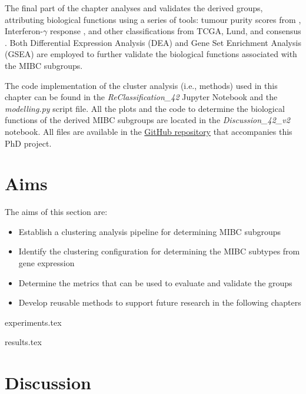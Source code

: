 The final part of the chapter analyses and validates the derived groups, attributing biological functions using a series of tools: tumour purity scores from \citet{Yoshihara2013-wq}, Interferon-$\gamma$ response \citet{Baker2022-bj}, and other classifications from TCGA, Lund, and consensus \citep{Robertson2017-mg,Marzouka2018-ge,Kamoun2020-tj}. Both Differential Expression Analysis (DEA) and Gene Set Enrichment Analysis (GSEA) are employed to further validate the biological functions associated with the MIBC subgroups.

The code implementation of the cluster analysis (i.e., methods) used in this chapter can be found in the \textit{ReClassification\_42} Jupyter Notebook and the \textit{modelling.py} script file. All the plots and the code to determine the biological functions of the derived MIBC subgroups are located in the \textit{Discussion\_42\_v2} notebook. All files are available in the \href{https://github.com/vladUng/Phd_thesis_exp}{GitHub repository} that accompanies this PhD project.


\section{Aims}

The aims of this section are:
\begin{itemize}
    \item Establish a clustering analysis pipeline for determining MIBC subgroups
    \item Identify the clustering configuration for determining the MIBC subtypes from gene expression
    \item Determine the metrics that can be used to evaluate and validate the groups
    \item Develop reusable methods to support future research in the following chapters
\end{itemize}




{experiments.tex}

{results.tex}

\section{Discussion} \label{s:cs:discussion}

